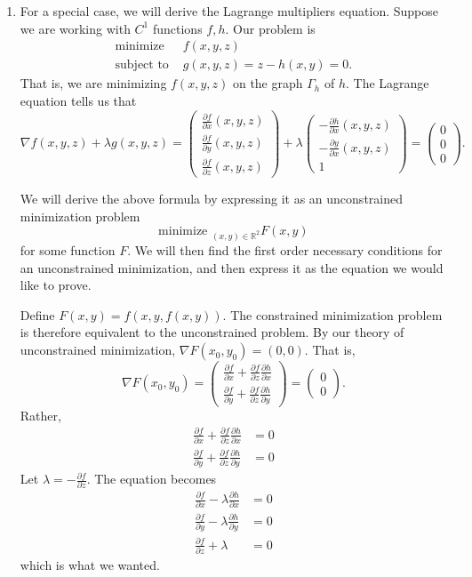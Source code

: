 \documentclass[11pt]{article}
\newcommand{\R}{\mathbb{R}}
\newcommand{\pd}{\partial}
\begin{document}
\begin{enumerate}
\item
For a special case, we will derive the Lagrange multipliers equation. Suppose we are working with $C^1$ functions $f,h$. Our problem is
\begin{align*}
\text{minimize } &f(x,y,z) \\
\text{subject to } &g(x,y,z) = z-h(x,y) = 0.
\end{align*}
That is, we are minimizing $f(x,y,z)$ on the graph $\Gamma_h$ of $h$. The Lagrange equation tells us that
\[
\nabla f(x,y,z) + \lambda g(x,y,z) = \begin{pmatrix}
\frac{\pd f}{\pd x}(x,y,z) \\ \frac{\pd f}{\pd y}(x,y,z) \\ \frac{\pd f}{\pd z}(x,y,z)
\end{pmatrix} + \lambda \begin{pmatrix}
-\frac{\pd h}{\pd x}(x,y,z) \\ -\frac{\pd y}{\pd x}(x,y,z) \\ 1
\end{pmatrix} = \begin{pmatrix}
0 \\ 0 \\ 0
\end{pmatrix}.
\]

We will derive the above formula by expressing it as an unconstrained minimization problem
\[ 
\text{minimize }_{(x,y) \in \R^2} F(x,y)
\]
for some function $F$. We will then find the first order necessary conditions for an unconstrained minimization, and then express it as the equation we would like to prove.

Define $F(x,y) = f(x,y,f(x,y))$. The constrained minimization problem is therefore equivalent to the unconstrained problem. By our theory of unconstrained minimization, $\nabla F(x_0,y_0)=(0,0)$. That is,
\[
\nabla F(x_0,y_0) = \begin{pmatrix}
\frac{\pd f}{\pd x} + \frac{\pd f}{\pd z}\frac{\pd h}{\pd x} \\
\frac{\pd f}{\pd y} + \frac{\pd f}{\pd z}\frac{\pd h}{\pd y}
\end{pmatrix} = \begin{pmatrix}
0\\0
\end{pmatrix}.
\]
Rather,
\begin{align*}
\frac{\pd f}{\pd x} + \frac{\pd f}{\pd z}\frac{\pd h}{\pd x} &= 0 \\
\frac{\pd f}{\pd y} + \frac{\pd f}{\pd z}\frac{\pd h}{\pd y} &= 0
\end{align*}
Let $\lambda = -\frac{\pd f}{\pd z}$. The equation becomes
\begin{align*}
\frac{\pd f}{\pd x} - \lambda \frac{\pd h}{\pd x} &= 0 \\
\frac{\pd f}{\pd y} - \lambda \frac{\pd h}{\pd y} &= 0 \\
\frac{\pd f}{\pd z} + \lambda &= 0
\end{align*}
which is what we wanted.
\end{enumerate}
\end{document}
